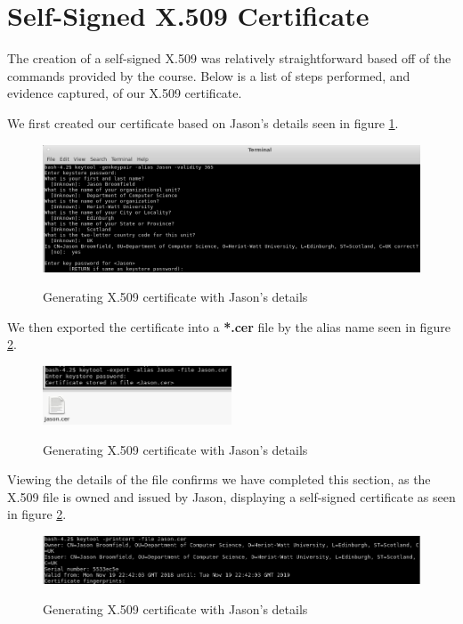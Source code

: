 \section{Self-Signed X.509 Certificate}

The creation of a self-signed X.509 was relatively straightforward based off of the commands provided by the course. Below is a list of steps performed, and evidence captured, of our X.509 certificate.

\noindent We first created our certificate based on Jason's details seen in figure \ref{fig:x509_creation:jason}.

\begin{figure}[hbt!]
	\centering
      \includegraphics[width=\textwidth]{imgs/x509_creation/x509_creation.PNG} \\
	\caption{Generating X.509 certificate with Jason's details}
	\label{fig:x509_creation:jason}
    \noindent\makebox[\linewidth]{}
\end{figure}

\noindent We then exported the certificate into a \textbf{*.cer} file by the alias name seen in figure \ref{fig:x509_creation:cert_exp}.

\begin{figure}[hbt!]
	\centering
      \includegraphics[width=0.5\textwidth]{imgs/x509_creation/x509_certificate_export.PNG} \\
	\caption{Generating X.509 certificate with Jason's details}
	\label{fig:x509_creation:cert_exp}
    \noindent\makebox[\linewidth]{}
\end{figure}

\noindent Viewing the details of the file confirms we have completed this section, as the X.509 file is owned and issued by Jason, displaying a self-signed certificate as seen in figure \ref{fig:x509_creation:cert_exp}.

\begin{figure}[hbt!]
	\centering
      \includegraphics[width=\textwidth]{imgs/x509_creation/cropped.png} \\
	\caption{Generating X.509 certificate with Jason's details}
	\label{fig:x509_creation:cert_deets}
    \noindent\makebox[\linewidth]{}
\end{figure}